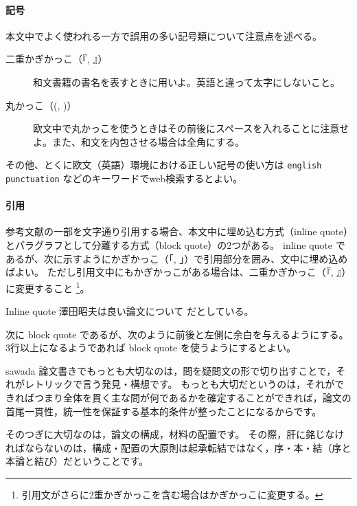 		\paragraph{記号}
			\label{par:symbol}

			本文中でよく使われる一方で誤用の多い記号類について注意点を述べる。

			\begin{description}
				\item[二重かぎかっこ（『, 』）] 和文書籍の書名を表すときに用いよ。英語と違って太字にしないこと。
				\item[丸かっこ（(, )）] 欧文中で丸かっこを使うときはその前後にスペースを入れることに注意せよ。また、和文を内包させる場合は全角にする。
			\end{description}

			\noindent
			その他、とくに欧文（英語）環境における正しい記号の使い方は \texttt{english punctuation} などのキーワードでweb検索するとよい。

		\paragraph{引用}
			\label{par:cite}

			参考文献の一部を文字通り引用する場合、本文中に埋め込む方式（inline quote）とパラグラフとして分離する方式（block quote）の2つがある。
			inline quote であるが、次に示すようにかぎかっこ（「, 」）で引用部分を囲み、文中に埋め込めばよい。
			ただし引用文中にもかぎかっこがある場合は、二重かぎかっこ（『, 』）に変更すること
			\footnote{引用文がさらに2重かぎかっこを含む場合はかぎかっこに変更する。}。

			\begin{itembox}[l]{Inline quote}
				澤田昭夫は良い論文について だとしている。
			\end{itembox}

			\noindent
			次に block quote であるが、次のように前後と左側に余白を与えるようにする。
			3行以上になるようであれば block quote を使うようにするとよい。

			\begin{displaycquote}[p. 74]{sawada}
				論文書きでもっとも大切なのは，問を疑問文の形で切り出すことで，それがレトリックで言う発見・構想です。
				もっとも大切だというのは，それができればつまり全体を貫く主な問が何であるかを確定することができれば，論文の首尾一貫性，統一性を保証する基本的条件が整ったことになるからです。

				そのつぎに大切なのは，論文の構成，材料の配置です。
				その際，肝に銘じなければならないのは，構成・配置の大原則は起承転結ではなく，序・本・結（序と本論と結び）だということです。
			\end{displaycquote}

